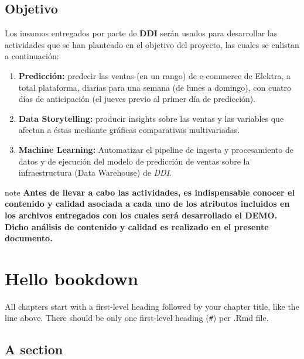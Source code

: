 \documentclass[
]{book}
\begin{document}
\hypertarget{objetivo}{%
\section*{Objetivo}\label{objetivo}}

Los insumos entregados por parte de \textbf{DDI} serán usados para desarrollar las actividades que se han planteado en el objetivo del proyecto, las cuales se enlistan a continuación:

\begin{enumerate}
\def\labelenumi{\arabic{enumi}.}
\item
  \textbf{Predicción:} predecir las ventas (en un rango) de e-commerce de Elektra, a total plataforma, diarias para una semana (de lunes a domingo), con cuatro días de anticipación (el jueves previo al primer día de predicción).
\item
  \textbf{Data Storytelling:} producir insights sobre las ventas y las variables que afectan a éstas mediante gráficas comparativas multivariadas.
\item
  \textbf{Machine Learning:} Automatizar el pipeline de ingesta y procesamiento de datos y de ejecución del modelo de predicción de ventas sobre la infraestructura (Data Warehouse) de \emph{DDI}.
\end{enumerate}

\begin{infobox}{note}
\textbf{Antes de llevar a cabo las actividades, es indispensable conocer el contenido y calidad asociada a cada uno de los atributos incluidos en los archivos entregados con los cuales será desarrollado el DEMO. Dicho análisis de contenido y calidad es realizado en el presente documento.}

\end{infobox}

\hypertarget{hello-bookdown}{%
\chapter{Hello bookdown}\label{hello-bookdown}}

All chapters start with a first-level heading followed by your chapter title, like the line above. There should be only one first-level heading (\texttt{\#}) per .Rmd file.

\hypertarget{a-section}{%
\section{A section}\label{a-section}}
\end{document}
